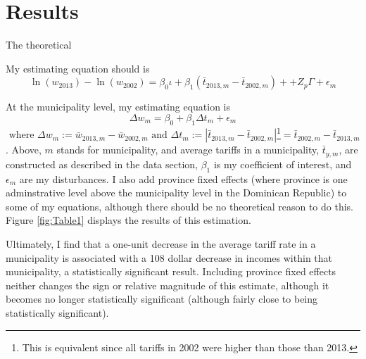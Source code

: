 \documentclass[12pt]{article}
\begin{document}
\vspace{-10pt}
\section{Results}
\label{sec:Results}


The theoretical 


My estimating equation should is 
\begin{equation}
\ln(w_{2013})- \ln(w_{2002}) = \beta_0 \iota + \beta_1( \bar{t}_{2013,m}-\bar{t}_{2002,m})+
+Z_p \Gamma + \epsilon_m
\end{equation}




At the municipality level, my estimating equation is 
\begin{equation}
\Delta w_m = \beta_0 + \beta_1 \Delta t_m + \epsilon_m 
\end{equation}
$\text{~where~}
\Delta w_m := \bar{w}_{2013,m} - \bar{w}_{2002,m} \text{~and~} \Delta t_m := 
\left|\bar{t}_{2013,m}-\bar{t}_{2002,m} \right|$\footnote{This is equivalent
since all tariffs in 2002 were higher than those than 2013.}$= \bar{t}_{2002,m}-\bar{t}_{2013,m}$.
Above, $m$ stands for municipality, and average tariffs in a municipality, $\bar{t}_{y,m}$, 
are constructed as described in the data section, $\beta_1$ is my coefficient of interest,
and $\epsilon_m$ are my disturbances.
I also add province fixed effects (where province is one adminstrative level
above the municipality level in the Dominican Republic) to some of my equations, 
although there should be no theoretical reason to do this. 
Figure \ref{fig:Table1} displays the results of this estimation.

Ultimately, I find that a one-unit decrease in the average tariff rate in a municipality
is associated with a 108 dollar decrease in incomes within that municipality, a 
statistically significant result. Including province fixed effects neither changes the 
sign or relative magnitude of this estimate, although it becomes no longer statistically
significant (although fairly close to being statistically significant).
\end{document}

